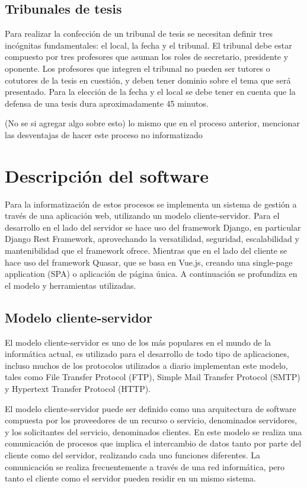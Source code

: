 \subsection{Tribunales de tesis}
Para realizar la confección de un tribunal de tesis
se necesitan definir tres incógnitas fundamentales: el local,
la fecha y el tribunal. El tribunal debe estar compuesto por tres
profesores que asuman los roles de secretario, presidente y 
oponente. Los profesores que integren el tribunal no pueden ser 
tutores o cotutores de la tesis en cuestión, y deben tener dominio
sobre el tema que será presentado.
Para la elección de la fecha y el local se debe tener en cuenta que la 
defensa de una tesis dura aproximadamente 45 minutos.

(No se si agregar algo sobre esto)
lo mismo que en el proceso anterior, mencionar las desventajas de 
hacer este proceso no informatizado




\section{Descripción del software}
Para la informatización de estos procesos se implementa 
un sistema de gestión a través de una aplicación web,
utilizando un modelo cliente-servidor.
Para el desarrollo en el lado del servidor se hace uso del framework Django, en particular Django Rest Framework, aprovechando la
versatilidad, seguridad, escalabilidad y mantenibilidad
que el framework ofrece.
Mientras que en el lado del cliente se hace uso
del framework Quasar, que se basa en Vue.js, creando una
single-page application (SPA) o aplicación de página única.
A continuación se profundiza en el modelo 
y herramientas utilizadas.

\subsection{Modelo cliente-servidor}
El modelo cliente-servidor es uno de los más populares en
el mundo de la informática actual, es utilizado para el 
desarrollo de todo tipo de aplicaciones, incluso muchos 
de los protocolos utilizados a diario implementan este modelo,
tales como File Transfer Protocol (FTP), Simple Mail Transfer Protocol
(SMTP) y Hypertext Transfer Protocol (HTTP).

El modelo cliente-servidor puede ser definido como una arquitectura
de software compuesta por los proveedores de un recurso o servicio, 
denominados servidores, y los solicitantes del servicio, denominados
clientes. En este modelo se realiza una comunicación de procesos
que implica el intercambio de datos tanto por parte del cliente 
como del servidor, realizando cada uno funciones diferentes. La comunicación
se realiza frecuentemente a través de una red informática, pero 
tanto el cliente como el servidor pueden residir en un mismo sistema.

